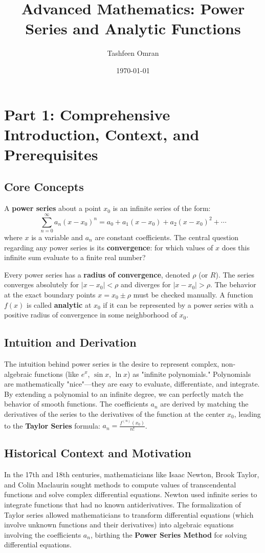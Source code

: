 \documentclass[11pt, letterpaper]{article}
\theoremstyle{definition}
\theoremstyle{remark}
\begin{document}
\title{\textbf{Advanced Mathematics: Power Series and Analytic Functions}}
\author{Tashfeen Omran}
\date{\today}
\maketitle

\tableofcontents
\newpage

\section{Part 1: Comprehensive Introduction, Context, and Prerequisites}

\subsection{Core Concepts}
A \textbf{power series} about a point $x_0$ is an infinite series of the form:
\[ \sum_{n=0}^{\infty} a_n (x - x_0)^n = a_0 + a_1(x - x_0) + a_2(x - x_0)^2 + \cdots \]
where $x$ is a variable and $a_n$ are constant coefficients. The central question regarding any power series is its \textbf{convergence}: for which values of $x$ does this infinite sum evaluate to a finite real number? 

Every power series has a \textbf{radius of convergence}, denoted $\rho$ (or $R$). The series converges absolutely for $|x - x_0| < \rho$ and diverges for $|x - x_0| > \rho$. The behavior at the exact boundary points $x = x_0 \pm \rho$ must be checked manually. A function $f(x)$ is called \textbf{analytic} at $x_0$ if it can be represented by a power series with a positive radius of convergence in some neighborhood of $x_0$.

\subsection{Intuition and Derivation}
The intuition behind power series is the desire to represent complex, non-algebraic functions (like $e^x$, $\sin x$, $\ln x$) as "infinite polynomials." Polynomials are mathematically "nice"—they are easy to evaluate, differentiate, and integrate. By extending a polynomial to an infinite degree, we can perfectly match the behavior of smooth functions. The coefficients $a_n$ are derived by matching the derivatives of the series to the derivatives of the function at the center $x_0$, leading to the \textbf{Taylor Series} formula: $a_n = \frac{f^{(n)}(x_0)}{n!}$.

\subsection{Historical Context and Motivation}
In the 17th and 18th centuries, mathematicians like Isaac Newton, Brook Taylor, and Colin Maclaurin sought methods to compute values of transcendental functions and solve complex differential equations. Newton used infinite series to integrate functions that had no known antiderivatives. The formalization of Taylor series allowed mathematicians to transform differential equations (which involve unknown functions and their derivatives) into algebraic equations involving the coefficients $a_n$, birthing the \textbf{Power Series Method} for solving differential equations.
\end{document}
